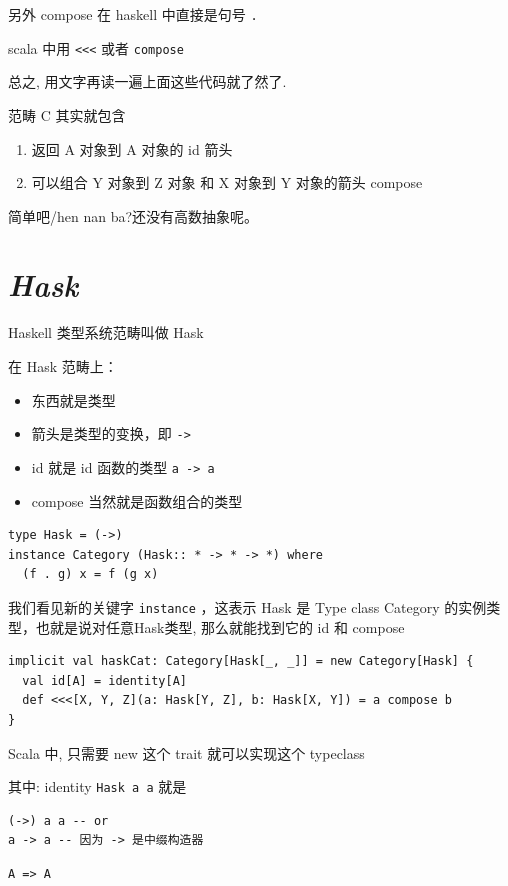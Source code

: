 \documentclass[11pt]{tufte-book}
\begin{document}
另外 compose 在 haskell 中直接是句号 \texttt{.}

scala 中用 \texttt{<<<} 或者 \texttt{compose}

总之, 用文字再读一遍上面这些代码就了然了.

范畴 C 其实就包含
\begin{enumerate}
\item 返回 A 对象到 A 对象的 id 箭头
\item 可以组合 Y 对象到 Z 对象 和 X 对象到 Y 对象的箭头 compose
\end{enumerate}

简单吧/hen nan ba?还没有高数抽象呢。

\section{\emph{Hask}}
\label{sec:orgac3c44b}
Haskell 类型系统范畴叫做 Hask

在 Hask 范畴上：

\begin{itemize}
\item 东西就是类型
\item 箭头是类型的变换，即 \texttt{->}
\item id 就是 id 函数的类型 \texttt{a -> a}
\item compose 当然就是函数组合的类型
\end{itemize}

\begin{verbatim}
type Hask = (->)
instance Category (Hask:: * -> * -> *) where
  (f . g) x = f (g x)
\end{verbatim}

我们看见新的关键字 \texttt{instance} ，这表示 Hask 是 Type class Category 的实例类型，也就是说对任意Hask类型, 那么就能找到它的 id 和 compose

\begin{verbatim}
implicit val haskCat: Category[Hask[_, _]] = new Category[Hask] {
  val id[A] = identity[A]
  def <<<[X, Y, Z](a: Hask[Y, Z], b: Hask[X, Y]) = a compose b
}
\end{verbatim}

Scala 中, 只需要 new 这个 trait 就可以实现这个 typeclass

其中: identity \texttt{Hask a a} 就是
\begin{verbatim}
(->) a a -- or
a -> a -- 因为 -> 是中缀构造器
\end{verbatim}

\begin{verbatim}
A => A
\end{verbatim}
\end{document}
